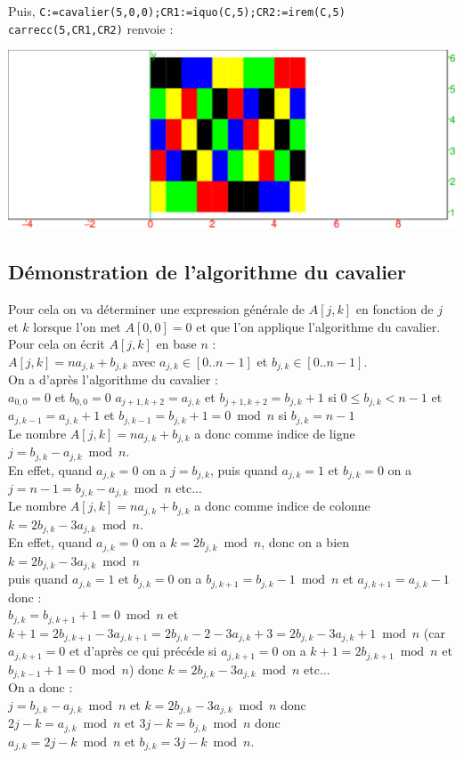 \documentclass[a4paper,11pt]{book}
\begin{document}
Puis, {\tt C:=cavalier(5,0,0);CR1:=iquo(C,5);CR2:=irem(C,5)}
{\tt carrecc(5,CR1,CR2)} renvoie :
\begin{center}\includegraphics[width=\textwidth]{carremb} \end{center}
\subsection{D\'emonstration de l'algorithme du cavalier}
Pour cela on va d\'eterminer une expression g\'en\'erale de $A[j,k]$ en 
fonction de $j$ et $k$ lorsque l'on met $A[0,0]=0$ et que l'on applique 
l'algorithme du cavalier.\\
 Pour cela on \'ecrit $A[j,k]$ en base $n$ :\\
$A[j,k]=na_{j,k}+b_{j,k}$ avec $a_{j,k}\in [0..n-1]$ et $b_{j,k}\in [0..n-1]$.\\
On a d'apr\`es l'algorithme du cavalier :\\
$a_{0,0}=0$ et $b_{0,0}=0$
$a_{j+1,k+2}=a_{j,k}$ et $b_{j+1,k+2}=b_{j,k}+1$ si $0\leq b_{j,k}<n-1$ et\\
$a_{j,k-1}=a_{j,k}+1$ et $b_{j,k-1}=b_{j,k}+1=0 \bmod n$ si $b_{j,k}=n-1$\\
Le nombre $A[j,k]=na_{j,k}+b_{j,k}$ a donc comme indice de ligne 
$j=b_{j,k}-a_{j,k} \bmod n$.\\
En effet, quand $a_{j,k}=0$ on a $j=b_{j,k}$, puis quand
$a_{j,k}=1$ et $b_{j,k}=0$ on a $j=n-1=b_{j,k}-a_{j,k} \bmod n$ etc...\\
Le nombre $A[j,k]=na_{j,k}+b_{j,k}$ a donc comme indice de colonne 
$k=2b_{j,k}-3a_{j,k} \bmod n$.\\
En effet,  quand $a_{j,k}=0$ on a $k=2b_{j,k} \bmod n$,
donc on a bien $k=2b_{j,k}-3a_{j,k} \bmod n$\\
puis quand $a_{j,k}=1$ et $b_{j,k}=0$ on a $b_{j,k+1}=b_{j,k}-1 \bmod n$ et 
$a_{j,k+1}=a_{j,k}-1$ donc :\\
$b_{j,k}=b_{j,k+1}+1=0 \bmod n$ et \\
$k+1=2b_{j,k+1}-3a_{j,k+1}=2b_{j,k}-2-3a_{j,k}+3=2b_{j,k}-3a_{j,k}+1 \bmod n$ (car 
$a_{j,k+1}=0$ et d'apr\`es ce qui pr\'ec\'ede si $a_{j,k+1}=0$ on a $k+1=2b_{j,k+1} \bmod n$ et $b_{j,k-1}+1=0 \bmod n$)
donc $k=2b_{j,k}-3a_{j,k} \bmod n$ etc...\\
On a donc :\\
$j=b_{j,k}-a_{j,k} \bmod n$ et $k=2b_{j,k}-3a_{j,k} \bmod n$ donc\\
$2j-k=a_{j,k}\bmod n$ et $3j-k=b_{j,k}\bmod n$ donc\\
$a_{j,k}=2j-k \bmod n$ et $b_{j,k}=3j-k \bmod n$.\\
\end{document}
